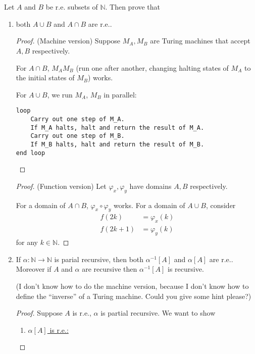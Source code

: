 \documentclass{article}
\theoremstyle{plain}
\newcommand{\N}{\mathbb{N}}
\begin{document}
\section{}
Let $A$ and $B$ be r.e. subsets of $\N$. Then prove that
\begin{enumerate}
  \item {
    both $A\cup B$ and $A\cap B$ are r.e..
    \begin{proof}(Machine version)
      Suppose $M_{A}, M_{B}$ are Turing machines that accept $A, B$
      respectively.

      For $A\cap B$, $M_{A}M_{B}$ (run one after another, changing
      halting states of $M_{A}$ to the initial states of $M_{B}$) works.

      For $A\cup B$, we run $M_{A}$, $M_{B}$ in parallel:
\begin{verbatim}
loop
    Carry out one step of M_A.
    If M_A halts, halt and return the result of M_A.
    Carry out one step of M_B.
    If M_B halts, halt and return the result of M_B.
end loop
\end{verbatim}
    \end{proof}
    \begin{proof}(Function version)
      Let $\varphi_{x}, \varphi_{y}$ have domains $A, B$ respectively.

      For a domain of $A\cap B$, $\varphi_{x}\circ\varphi_{y}$ works.
      For a domain of $A\cup B$, consider
      \begin{align*}
        f(2k) &= \varphi_{x}(k)\\
        f(2k+1) &= \varphi_{y}(k)
      \end{align*}
      for any $k\in\N$.
    \end{proof}
  }

  \item {If $\alpha:\N\to\N$ is parial recursive, then both $\alpha^{-1}[A]$ and $\alpha[A]$ are
    r.e.. Moreover if $A$ and $\alpha$ are recursive then $\alpha^{-1}[A]$ is recursive.

    \medskip
    (I don't know how to do the machine version, because I don't
    know how to define the ``inverse'' of a Turing machine. Could you give
    some hint please?)
    \begin{proof}Suppose $A$ is r.e., $\alpha$ is partial recursive.
      We want to show
      \begin{enumerate}
        \item {
          \underline{$\alpha[A]$ is r.e.:}

}
\end{enumerate}
\end{proof}}
\end{enumerate}
\end{document}
